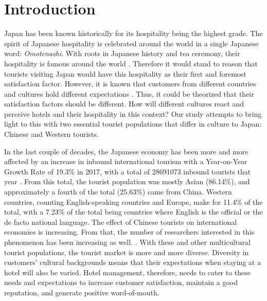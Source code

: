 \documentclass[smallextended,natbib]{svjour3}       %
\begin{document}
\section{Introduction}\label{intro}

  Japan has been known historically for its hospitality being the highest grade. The spirit of Japanese hospitality is celebrated around the world in a single Japanese word: \textit{Omotenashi}. With roots in Japanese history and tea ceremony, their hospitality is famous around the world \cite[][]{al2015characteristics}. Therefore it would stand to reason that tourists visiting Japan would have this hospitality as their first and foremost satisfaction factor. However, it is known that customers from different countries and cultures hold different expectations \cite[][]{engel1990}. Thus, it could be theorized that their satisfaction factors should be different. How will different cultures react and perceive hotels and their hospitality in this context? Our study attempts to bring light to this with two essential tourist populations that differ in culture to Japan: Chinese and Western tourists. 

  In the last couple of decades, the Japanese economy has been more and more affected by an increase in inbound international tourism \cite[][]{jones2009} with a Year-on-Year Growth Rate of 19.3\% in 2017, with a total of \num[group-separator={,}]{28691073} inbound tourists that year \cite[][]{jnto2003-2019}. From this total, the tourist population was mostly Asian (86.14\%), and approximately a fourth of the total (25.63\%) came from China. Western countries, counting English-speaking countries and Europe, make for 11.4\% of the total, with a 7.23\% of the total being countries where English is the official or the de facto national language. The effect of Chinese tourists on international economies is increasing. From that, the number of researchers interested in this phenomenon has been increasing as well. \cite[][]{sun2017}. With these and other multicultural tourist populations, the tourist market is more and more diverse. Diversity in customers' cultural backgrounds means that their expectations when staying at a hotel will also be varied. Hotel management, therefore, needs to cater to these needs and expectations to increase customer satisfaction, maintain a good reputation, and generate positive word-of-mouth.
\end{document}
